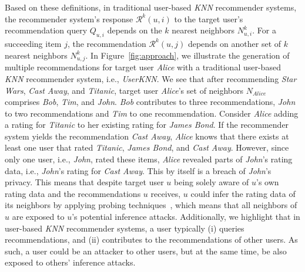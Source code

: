 \documentclass[manuscript,review,anonymous]{acmart}
\begin{document}
Based on these definitions, in traditional user-based \emph{KNN} recommender systems, the recommender system's response $\mathcal{R}^k(u, i)$ to the target user's recommendation query $Q_{u, i}$ depends on the $k$ nearest neighbors $N^k_{u, i}$.
For a succeeding item $j$, the recommendation $\mathcal{R}^k(u, j)$ depends on another set of $k$ nearest neighbors $N^k_{u, j}$.
In Figure~\ref{fig:approach}, we illustrate the generation of multiple recommendations for target user \emph{Alice} with a traditional user-based \emph{KNN} recommender system, i.e., \emph{UserKNN}. 
We see that after recommending \emph{Star Wars}, \emph{Cast Away}, and \emph{Titanic}, target user \emph{Alice}'s set of neighbors $N_{Alice}$ comprises \emph{Bob}, \emph{Tim}, and \emph{John}.
\emph{Bob} contributes to three recommendations, \emph{John} to two recommendations and \emph{Tim} to one recommendation. 
Consider \emph{Alice} adding a rating for \emph{Titanic} to her existing rating for \emph{James Bond}.
If the recommender system yields the recommendation \emph{Cast Away}, \emph{Alice} knows that there exists at least one user that rated \emph{Titanic}, \emph{James Bond}, and \emph{Cast Away}.
However, since only one user, i.e., \emph{John}, rated these items, \emph{Alice} revealed parts of \emph{John}'s rating data, i.e., \emph{John}'s rating for \emph{Cast Away}.
This by itself is a breach of \emph{John}'s privacy.
This means that despite target user $u$ being solely aware of $u$'s own rating data and the recommendations $u$ receives, $u$ could infer the rating data of its neighbors by applying probing techniques~\cite{calandrino2011you,ramakrishnan2001being}, which means that all neighbors of $u$ are exposed to $u$'s potential inference attacks.
Additionally, we highlight that in user-based \emph{KNN} recommender systems, a user typically (i) queries recommendations, and (ii) contributes to the recommendations of other users.
As such, a user could be an attacker to other users, but at the same time, be also exposed to others' inference attacks.
\end{document}

